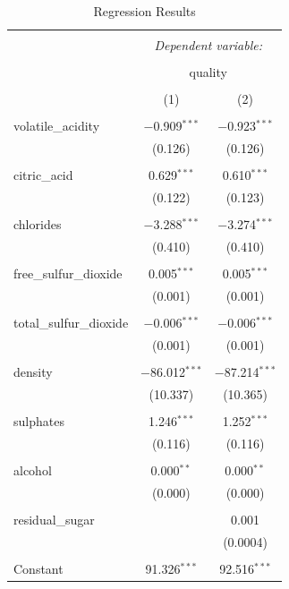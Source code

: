 \documentclass[a4paper,9pt,twocolumn,twoside,]{pinp}
\begin{document}
\begin{table}[!htbp] \centering 
  \caption{Regression Results} 
  \label{} 
\begin{tabular}{@{\extracolsep{5pt}}lcc} 
\\[-1.8ex]\hline 
\hline \\[-1.8ex] 
 & \multicolumn{2}{c}{\textit{Dependent variable:}} \\ 
\cline{2-3} 
\\[-1.8ex] & \multicolumn{2}{c}{quality} \\ 
\\[-1.8ex] & (1) & (2)\\ 
\hline \\[-1.8ex] 
 volatile\_acidity & $-$0.909$^{***}$ & $-$0.923$^{***}$ \\ 
  & (0.126) & (0.126) \\ 
  & & \\ 
 citric\_acid & 0.629$^{***}$ & 0.610$^{***}$ \\ 
  & (0.122) & (0.123) \\ 
  & & \\ 
 chlorides & $-$3.288$^{***}$ & $-$3.274$^{***}$ \\ 
  & (0.410) & (0.410) \\ 
  & & \\ 
 free\_sulfur\_dioxide & 0.005$^{***}$ & 0.005$^{***}$ \\ 
  & (0.001) & (0.001) \\ 
  & & \\ 
 total\_sulfur\_dioxide & $-$0.006$^{***}$ & $-$0.006$^{***}$ \\ 
  & (0.001) & (0.001) \\ 
  & & \\ 
 density & $-$86.012$^{***}$ & $-$87.214$^{***}$ \\ 
  & (10.337) & (10.365) \\ 
  & & \\ 
 sulphates & 1.246$^{***}$ & 1.252$^{***}$ \\ 
  & (0.116) & (0.116) \\ 
  & & \\ 
 alcohol & 0.000$^{**}$ & 0.000$^{**}$ \\ 
  & (0.000) & (0.000) \\ 
  & & \\ 
 residual\_sugar &  & 0.001 \\ 
  &  & (0.0004) \\ 
  & & \\ 
 Constant & 91.326$^{***}$ & 92.516$^{***}$ \\ 

\end{tabular}
\end{table}
\end{document}
